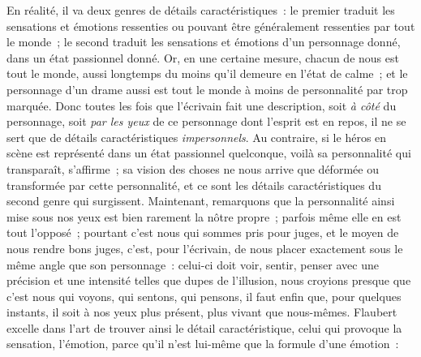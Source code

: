 \documentclass[french,twoside]{book} %
\begin{document}
\noindent En réalité, il va deux genres de détails caractéristiques : le premier traduit les sensations et émotions ressenties ou pouvant être généralement ressenties par tout le monde ; le second traduit les sensations et émotions d’un personnage donné, dans un état passionnel donné. Or, en une certaine mesure, chacun de nous est tout le monde, aussi longtemps du moins qu’il demeure en l’état de calme ; et le personnage d’un drame aussi est tout le monde à moins de personnalité par trop marquée. Donc toutes les fois que l’écrivain fait une description, soit \emph{à côté} du personnage, soit \emph{par les yeux} de ce personnage dont l’esprit est en repos, il ne se sert que de détails caractéristiques \emph{impersonnels}. Au contraire, si le héros en scène est représenté dans un état passionnel quelconque, voilà sa personnalité qui transparaît, s’affirme ; sa vision des choses ne nous arrive que déformée ou transformée par cette personnalité, et ce sont les détails caractéristiques du second genre qui surgissent. Maintenant, remarquons que la personnalité ainsi mise sous nos yeux est bien rarement la nôtre propre ; parfois même elle en est tout l’opposé ; pourtant c’est nous qui sommes pris pour juges, et le moyen de nous rendre bons juges, c’est, pour l’écrivain, de nous placer exactement sous le même angle que son personnage : celui-ci doit voir, sentir, penser avec une précision et une intensité telles que dupes de l’illusion, nous croyions presque que c’est nous qui voyons, qui sentons, qui pensons, il faut enfin que, pour quelques instants, il soit à nos yeux plus présent, plus vivant que nous-mêmes. Flaubert excelle dans l’art de trouver ainsi le détail caractéristique, celui qui provoque la sensation, l’émotion, parce qu’il n’est lui-même que la formule d’une émotion :\par
\end{document}
